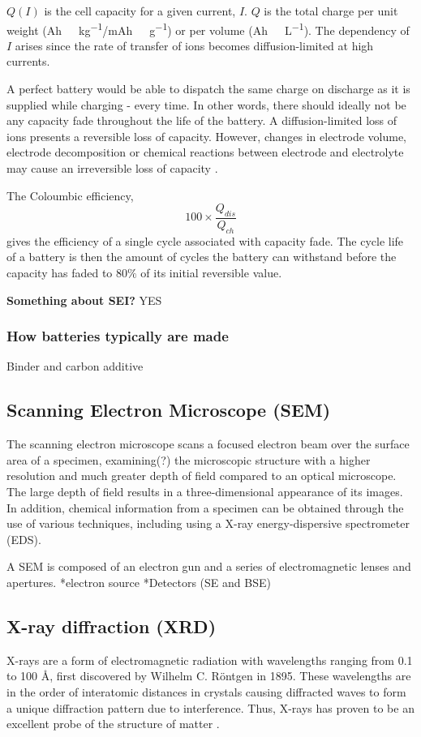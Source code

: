 \documentclass[Main/main.tex]{subfiles}
\begin{document}
$Q(I)$ is the cell capacity for a given current, $I$. $Q$ is the total charge per unit weight (\si{Ah\ kg^{-1}}/\si{mAh\ g^{-1}}) or per volume (\si{Ah\ L^{-1}}). The dependency of $I$ arises since the rate of transfer of ions becomes diffusion-limited at high currents. 

A perfect battery would be able to dispatch the same charge on discharge as it is supplied while charging - every time. In other words, there should ideally not be any capacity fade throughout the life of the battery. A diffusion-limited loss of ions presents a reversible loss of capacity. However, changes in electrode volume, electrode decomposition or chemical reactions between electrode and electrolyte may cause an irreversible loss of capacity \cite{2_Goodenough_perspective}.

The Coloumbic efficiency, \[ 100 \times \frac{Q_{dis}}{Q_{ch}} \] gives the efficiency of a single cycle associated with capacity fade. The cycle life of a battery is then the amount of cycles the battery can withstand before the capacity has faded to $80\%$ of its initial reversible value.


\textbf{Something about SEI?}
YES

\subsubsection{How batteries typically are made}

Binder and carbon additive 


\subsection{Scanning Electron Microscope (SEM)}
The scanning electron microscope scans a focused electron beam over the surface area of a specimen, examining(?) the microscopic structure with a higher resolution and much greater depth of field compared to an optical microscope. The large depth of field results in a three-dimensional appearance of its images. In addition, chemical information from a specimen can be obtained through the use of various techniques, including using a X-ray energy-dispersive spectrometer (EDS).

A SEM is composed of an electron gun and a series of electromagnetic lenses and apertures. 
*electron source
*Detectors (SE and BSE)

\subsection{X-ray diffraction (XRD)}
X-rays are a form of electromagnetic radiation with wavelengths ranging from 0.1 to 100 \si{\angstrom}, first discovered by Wilhelm C. Röntgen in 1895. These wavelengths are in the order of interatomic distances in crystals causing diffracted waves to form a unique diffraction pattern due to interference. Thus, X-rays has proven to be an excellent probe of the structure of matter \cite{2_XRD,Scotman}.
\end{document}
